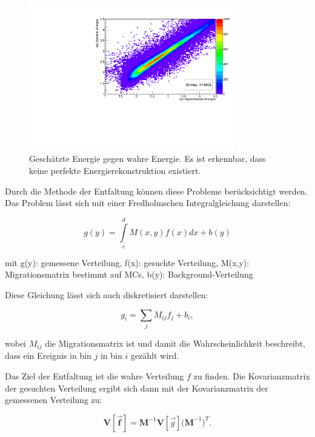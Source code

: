 \begin{figure}
    \centering
    \includegraphics[width=0.8\textwidth]{./Plots/04_MrkAnalyse/EnergyEst_EnergyTrue.pdf}
    \caption{Geschätzte Energie gegen wahre Energie. Es ist erkennbar, dass keine perfekte Energierekonstruktion existiert.}
    \label{EnergyEst_EnergyTrue}
\end{figure}

Durch die Methode der Entfaltung können diese Probleme berücksichtigt werden. 
Das Problem lässt sich mit einer Fredholmschen Integralgleichung darstellen:

\begin{equation}
 g(y)= \int\limits_c^d M(x,y) f(x) dx + b(y)
\end{equation}
\begin{centering}
  \small{mit g(y): gemessene Verteilung, f(x): gesuchte Verteilung, M(x,y): Migrationsmatrix bestimmt auf MCs, b(y): Background-Verteilung}
 \end{centering}

Diese Gleichung lässt sich auch diskretisiert darstellen:

\begin{equation}
 g_i=\sum_j M_{ij}f_j+b_i,
\end{equation}

wobei $M_{ij}$ die Migrationsmatrix ist und damit die Wahrscheinlichkeit beschreibt, dass ein Ereignis in bin $j$ in bin $i$ gezählt wird.

Das Ziel der Entfaltung ist die wahre Verteilung $f$ zu finden.
Die Kovarianzmatrix der gesuchten Verteilung ergibt sich dann mit der Kovarianzmatrix der gemessenen Verteilung zu:

\begin{equation}
 \mathbf{V[\vec{f}]}=\mathbf{M}^{-1}\mathbf{V}[\vec{g}]\mathbf{(M}^{-1})^T.
\end{equation}

